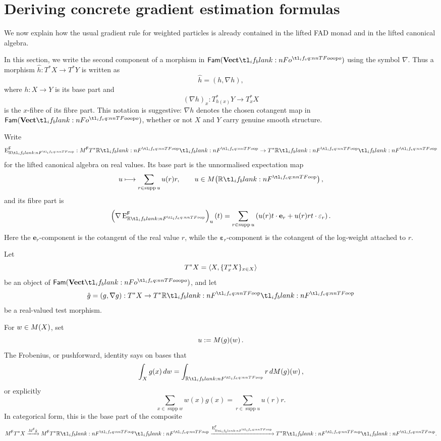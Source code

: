 \documentclass[11pt,a4paper]{article}
\theoremstyle{definition}
\theoremstyle{remark}
\providecommand{\Fam}[1]{\mathsf{Fam}(#1)}
\providecommand{\supp}{\operatorname{supp}}
\providecommand{\vect}[1]{\mathbf{#1}}
\begin{document}
\section{Deriving concrete gradient estimation formulas}
We now explain how the usual gradient rule for weighted particles is
already contained in the lifted FAD monad and in the lifted canonical
algebra.

In this section, we write the second component of a morphism in
\(\Fam{\Vect[o]}\) using the symbol \(\nabla\).  Thus a morphism
\(\hat h:T^*X\to T^*Y\) is written as
\[
  \hat h=(h,\nabla h),
\]
where \(h:X\to Y\) is its base part and
\[
  (\nabla h)_x:T^*_{h(x)}Y\to T^*_xX
\]
is the \(x\)-fibre of its fibre part.  This notation is suggestive:
\(\nabla h\) denotes the chosen cotangent map in
\(\Fam{\Vect[o]}\), whether or not \(X\) and \(Y\) carry genuine smooth
structure.

Write
\[
  \opn{E}^{\cat[]{F}}_{\R}:M^{\cat[]{F}}\TR\to\TR
\]
for the lifted canonical algebra on real values.  Its base part is the
unnormalised expectation map
\[
  u\longmapsto
  \sum_{r\in\supp u}u(r)r,
  \qquad
  u\in\Fun[nn]{M}{\R},
\]
and its fibre part is
\begin{equation}
  \label{eq:appendix-lifted-real-expectation-fibre}
  \left(\nabla\opn{E}^{\cat[]{F}}_{\R}\right)_u(t)
  =
  \sum_{r\in\supp u}
  \left(
    u(r)t\cdot\vect{e}_{r}
    +
    u(r)r t\cdot\vect{\varepsilon}_{r}
  \right).
\end{equation}
Here the \(\vect{e}_{r}\)-component is the cotangent of the real value
\(r\), while the \(\vect{\varepsilon}_{r}\)-component is the cotangent of
the log-weight attached to \(r\).

Let
\[
  T^*X=\left\langle X,\{T^*_xX\}_{x\in X}\right\rangle
\]
be an object of \(\Fam{\Vect[o]}\), and let
\[
  \hat g=(g,\nabla g):T^*X\to\TR
\]
be a real-valued test morphism.  

For \(w\in\Fun[nn]{M}{X}\), set
\[
  u:=\fn[n]{\Fun[nn]{M}{g}}{w}.
\]
The Frobenius, or pushforward, identity says on bases that
\[
  \int_X g(x)\,dw
  =
  \int_{\R} r\,d\fn[n]{\Fun[nn]{M}{g}}{w},
\]
or explicitly
\[
  \sum_{x\in\supp w}w(x)g(x)
  =
  \sum_{r\in\supp u}u(r)r.
\]
In categorical form, this is the base part of the composite
\[
  M^{\cat[]{F}}T^*X
  \xrightarrow{M^{\cat[]{F}}\hat g}
  M^{\cat[]{F}}\TR
  \xrightarrow{\opn{E}^{\cat[]{F}}_{\R}}
  \TR.
\]
\end{document}
